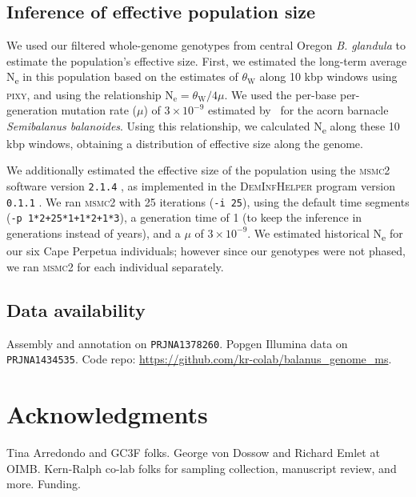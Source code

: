 \documentclass[11pt]{article}
\newcommand{\bgla}{\textit{B. glandula}\xspace}
\newcommand{\Ne}{N\textsubscript{e}\xspace}
\begin{document}
\subsection*{Inference of effective population size}

We used our filtered whole-genome genotypes from central Oregon \bgla{} to estimate the
population's effective size.
First, we estimated the long-term average \Ne{} in this population based on the
estimates of $\theta_\text{W}$ along 10 kbp windows using \textsc{pixy}, and using the
relationship $\text{N}_\text{e} = \theta_\text{W}/4\mu$.
We used the per-base per-generation mutation rate ($\mu$) of $3\times10^{-9}$ estimated
by~\cite{nunez_footprints_2020} for the acorn barnacle \textit{Semibalanus balanoides}.
Using this relationship, we calculated \Ne{} along these 10 kbp windows, obtaining a
distribution of effective size along the genome.
\vspace{0.2cm}

We additionally estimated the effective size of the population using the \textsc{msmc2}
software version \texttt{2.1.4} \citep{dutheil_msmc_2020}, as implemented in the
\textsc{DemInfHelper} program version \texttt{0.1.1} \citep{forest_popsize_2024}.
We ran \textsc{msmc2} with 25 iterations (\texttt{-i 25}), using the default
time segments (\texttt{-p 1*2+25*1+1*2+1*3}), a generation time of 1 (to keep the inference
in generations instead of years), and a $\mu$ of $3\times10^{-9}$.
We estimated historical \Ne{} for our six Cape Perpetua individuals; however since
our genotypes were not phased, we ran \textsc{msmc2} for each individual separately.

\subsection*{Data availability}

Assembly and annotation on \texttt{PRJNA1378260}.
Popgen Illumina data on \texttt{PRJNA1434535}.
Code repo: \url{https://github.com/kr-colab/balanus_genome_ms}.

\section*{Acknowledgments}

Tina Arredondo and GC3F folks. George von Dossow and Richard Emlet at OIMB.
Kern-Ralph co-lab folks for sampling collection, manuscript review, and more.
Funding.

\pagebreak
\end{document}
